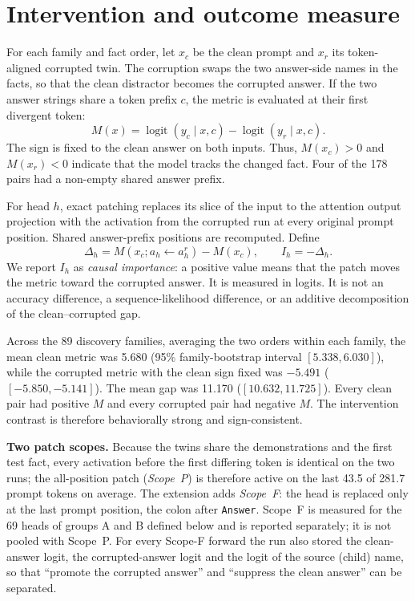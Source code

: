 \documentclass[11pt,a4paper]{article}
\begin{document}
\section{Intervention and outcome measure}
For each family and fact order, let $x_c$ be the clean prompt and $x_r$ its
token-aligned corrupted twin. The corruption swaps the two answer-side names in
the facts, so that the clean distractor becomes the corrupted answer. If the two
answer strings share a token prefix $c$, the metric is evaluated at their first
divergent token:
\begin{equation}
M(x)=\operatorname{logit}(y_c\mid x,c)-
     \operatorname{logit}(y_r\mid x,c).
\end{equation}
The sign is fixed to the clean answer on both inputs. Thus, $M(x_c)>0$ and
$M(x_r)<0$ indicate that the model tracks the changed fact. Four of the 178
pairs had a non-empty shared answer prefix.

For head $h$, exact patching replaces its slice of the input to the attention
output projection with the activation from the corrupted run at every original
prompt position. Shared answer-prefix positions are recomputed. Define
\begin{equation}
\Delta_h=M(x_c; a_h\leftarrow a_h^{r})-M(x_c),
\qquad I_h=-\Delta_h.
\end{equation}
We report $I_h$ as \emph{causal importance}: a positive value means that the
patch moves the metric toward the corrupted answer. It is measured in logits.
It is not an accuracy difference, a sequence-likelihood difference, or an
additive decomposition of the clean--corrupted gap.

Across the 89 discovery families, averaging the two orders within each family,
the mean clean metric was 5.680 (95\% family-bootstrap interval
$[5.338,6.030]$), while the corrupted metric with the clean sign fixed was
$-5.491$ ($[-5.850,-5.141]$). The mean gap was 11.170
($[10.632,11.725]$). Every clean pair had positive $M$ and every corrupted pair
had negative $M$. The intervention contrast is therefore behaviorally strong
and sign-consistent.

\textbf{Two patch scopes.} Because the twins share the demonstrations and the
first test fact, every activation before the first differing token is identical
on the two runs; the all-position patch (\emph{Scope~P}) is therefore active on
the last 43.5 of 281.7 prompt tokens on average. The extension adds
\emph{Scope~F}: the head is replaced only at the last prompt position, the colon
after \texttt{Answer}. Scope~F is measured for the 69 heads of groups A and B
defined below and is reported separately; it is not pooled with Scope~P. For every
Scope-F forward the run also stored the clean-answer logit, the corrupted-answer
logit and the logit of the source (child) name, so that ``promote the corrupted
answer'' and ``suppress the clean answer'' can be separated.
\end{document}
